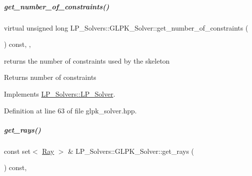 \mbox{\label{group___c_l_s_solvers_af28eb491140e583b453773ead208ae32}} 
\subparagraph{\texorpdfstring{get\+\_\+number\+\_\+of\+\_\+constraints()}{get\_number\_of\_constraints()}}
{\footnotesize\ttfamily virtual unsigned long L\+P\+\_\+\+Solvers\+::\+G\+L\+P\+K\+\_\+\+Solver\+::get\+\_\+number\+\_\+of\+\_\+constraints (\begin{DoxyParamCaption}{ }\end{DoxyParamCaption}) const\hspace{0.3cm}{\ttfamily [inline]}, {\ttfamily [override]}, {\ttfamily [virtual]}}



returns the number of constraints used by the skeleton 

\begin{DoxyReturn}{Returns}
number of constraints 
\end{DoxyReturn}


Implements \hyperlink{group___c_l_s_solvers_a1a220bc10c6d8696dd5885d7f3678e5f}{L\+P\+\_\+\+Solvers\+::\+L\+P\+\_\+\+Solver}.



Definition at line 63 of file glpk\+\_\+solver.\+hpp.

\mbox{\label{group___c_l_s_solvers_a9ded7ec7a82decb93132e10e25851528}} 
\subparagraph{\texorpdfstring{get\+\_\+rays()}{get\_rays()}}
{\footnotesize\ttfamily const set$<$ \hyperlink{group___c_l_s_solvers_class_l_p___solvers_1_1_ray}{Ray} $>$ \& L\+P\+\_\+\+Solvers\+::\+G\+L\+P\+K\+\_\+\+Solver\+::get\+\_\+rays (\begin{DoxyParamCaption}{ }\end{DoxyParamCaption}) const\hspace{0.3cm}{\ttfamily [override]}, {\ttfamily [virtual]}}



